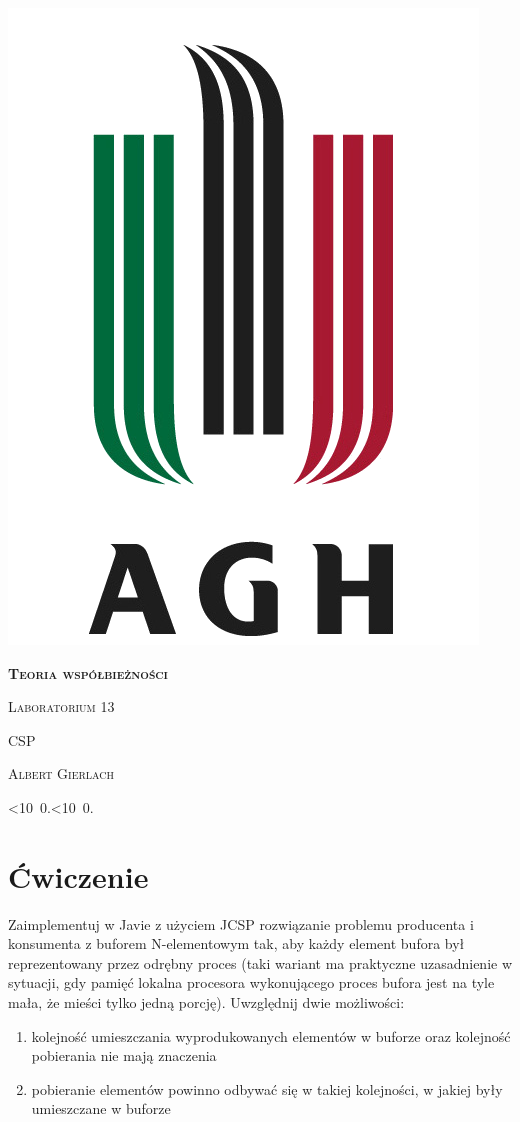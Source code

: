 \documentclass[12pt]{article}
\def\mydate{\leavevmode\hbox{\twodigits\day.\twodigits\month.\the\year}}
\def\twodigits#1{\ifnum#1<10 0\fi\the#1}
\begin{document}
\thispagestyle{empty}
\begin{center}
\begin{minipage}{0.75\linewidth}
    \centering
    \includegraphics[width=0.45\linewidth]{agh_logo2.png}
    \par
    \vspace{2cm}
    {\bfseries{\scshape{\Huge  Teoria współbieżności}}}
    \par
    \vspace{1.7cm}
    {\scshape{\Large Laboratorium 13}}
    \par
    \vspace{0.8cm}
    {\scshape{\Large CSP}}
    \par
    \vspace{3cm}

    {\scshape{\Large Albert Gierlach}}\par
    \vspace{1cm}

    {\Large \mydate}
\end{minipage}
\end{center}
\clearpage



\section{Ćwiczenie}
Zaimplementuj w Javie z użyciem JCSP rozwiązanie problemu producenta i konsumenta z buforem N-elementowym tak, aby każdy element bufora był reprezentowany przez odrębny proces (taki wariant
ma praktyczne uzasadnienie w sytuacji, gdy pamięć lokalna procesora wykonującego proces bufora jest na tyle mała, że mieści tylko jedną
porcję). Uwzględnij dwie możliwości:
\begin{enumerate}[label=\alph*)]
    \item kolejność umieszczania wyprodukowanych elementów w buforze
oraz kolejność pobierania nie mają znaczenia
    \item pobieranie elementów powinno odbywać się w takiej kolejności, w
jakiej były umieszczane w buforze
\end{enumerate}
\end{document}
